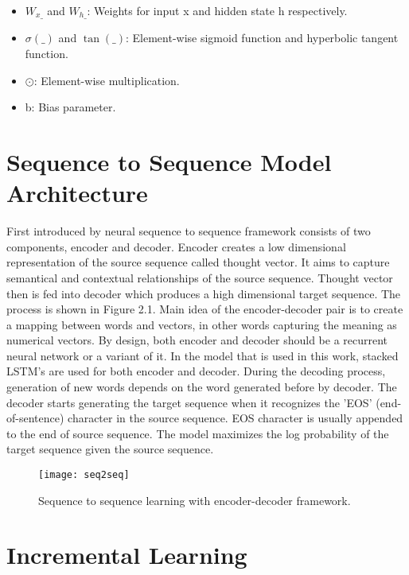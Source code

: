 \begin{itemize}

\item $W_{x\_}$ and $W_{h\_}$: Weights for input x and hidden state h respectively.

\item $\sigma(\_)$ and $\tan(\_)$: Element-wise sigmoid function and hyperbolic tangent function.

\item $\odot$: Element-wise multiplication.

\item b: Bias parameter.

\end{itemize}

\section{Sequence to Sequence Model Architecture}

First introduced by \cite{Vinyalsetal} neural sequence to sequence framework consists of two components, encoder and decoder. Encoder creates a low dimensional representation of the source sequence called thought vector. It aims to capture semantical and contextual relationships of the source sequence. Thought vector then is fed into decoder which produces a high dimensional target sequence. The process is shown in Figure 2.1. Main idea of the encoder-decoder pair is to create a mapping between words and vectors, in other words capturing the meaning as numerical vectors. By design, both encoder and decoder should be a recurrent neural network or a variant of it. In the model that is used in this work, stacked LSTM's are used for both encoder and decoder. During the decoding process, generation of new words depends on the word generated before by decoder. The decoder starts generating the target sequence when it recognizes the 'EOS' (end-of-sentence) character in the source sequence. EOS character is usually appended to the end of source sequence. The model maximizes the log probability of the target sequence given the source sequence.

\begin{figure}[t]
\texttt{[image: seq2seq]}
\centering
\caption{Sequence to sequence learning with encoder-decoder framework.}
\end{figure}

\section{Incremental Learning}

